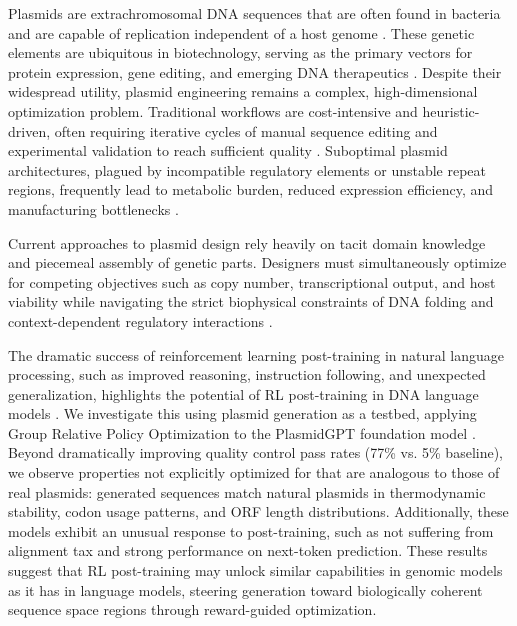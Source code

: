 \documentclass{article}
\theoremstyle{plain}
\theoremstyle{definition}
\theoremstyle{remark}
\begin{document}
Plasmids are extrachromosomal DNA sequences that are often found in
bacteria and are capable of replication
independent of a host genome \cite{lederberg1952}. These genetic
elements are ubiquitous in biotechnology, serving as the primary vectors
for protein expression, gene editing, and emerging DNA therapeutics
\cite{plasmid_manufacturing, plasmid_therapeutics}. Despite their
widespread utility, plasmid engineering remains a complex,
high-dimensional optimization problem. Traditional workflows are cost-intensive and heuristic-driven, often requiring iterative cycles of
manual sequence editing and experimental validation to reach sufficient quality \cite{structural_instability, plasmid_design_challenges1}. 
Suboptimal plasmid architectures, plagued
by incompatible regulatory elements or unstable repeat regions,
frequently lead to metabolic burden, reduced expression efficiency, and
manufacturing bottlenecks \cite{plasmid_design_challenges2,
metabolic_burden}.

Current approaches to plasmid design rely heavily on tacit domain
knowledge and piecemeal assembly of genetic parts. Designers must
simultaneously optimize for competing objectives such as copy number,
transcriptional output, and host viability while navigating the strict
biophysical constraints of DNA folding and context-dependent regulatory
interactions \cite{gene_to_performance, clonefast}.

The dramatic success of reinforcement learning post-training in natural
language processing, such as improved reasoning, instruction following,
and unexpected generalization, highlights the potential of RL post-training in DNA language models \cite{emergent_abilities_of_large_language_models, emergent_rl}. We
investigate this using plasmid generation as a testbed, applying Group
Relative Policy Optimization to the PlasmidGPT foundation model
\cite{plasmidgpt}. Beyond dramatically improving quality control pass
rates (77\% vs. 5\% baseline), we observe properties not explicitly
optimized for that are analogous to those of real plasmids: generated
sequences match natural plasmids in
thermodynamic stability, codon usage patterns, and ORF length
distributions. Additionally, these models exhibit an unusual response to
post-training, such as not suffering from alignment tax and strong
performance on next-token prediction.
These results suggest that RL post-training may unlock
similar capabilities in genomic models as it has in language
models, steering generation toward biologically coherent sequence space
regions through reward-guided optimization.
\end{document}

